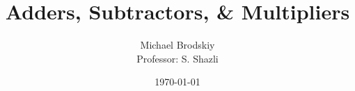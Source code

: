 


\pagestyle{fancy}

\title{Adders, Subtractors, \& Multipliers}
\date{\today}
\author{Michael Brodskiy\\ \small Professor: S. Shazli}



\maketitle

\thispagestyle{fancy}

\newpage

